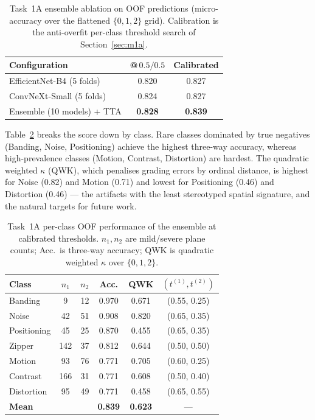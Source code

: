 \documentclass[runningheads]{llncs}
\begin{document}
\begin{table}[htbp]
\caption{Task~1A ensemble ablation on OOF predictions (micro-accuracy over the
flattened $\{0,1,2\}$ grid). Calibration is the anti-overfit per-class threshold
search of Section~\ref{sec:m1a}.}
\label{tab:ensemble}
\centering
\setlength{\tabcolsep}{8pt}
\begin{tabular}{lcc}
\toprule
Configuration & @\,$0.5/0.5$ & Calibrated \\
\midrule
EfficientNet-B4 (5 folds)      & 0.820 & 0.827 \\
ConvNeXt-Small (5 folds)       & 0.824 & 0.827 \\
Ensemble (10 models) + TTA     & \textbf{0.828} & \textbf{0.839} \\
\bottomrule
\end{tabular}
\end{table}

Table~\ref{tab:perclass} breaks the score down by class. Rare classes dominated
by true negatives (Banding, Noise, Positioning) achieve the highest three-way
accuracy, whereas high-prevalence classes (Motion, Contrast, Distortion) are
hardest. The quadratic weighted $\kappa$ (QWK), which penalises grading errors by
ordinal distance, is highest for Noise (0.82) and Motion (0.71) and lowest for
Positioning (0.46) and Distortion (0.46) --- the artifacts with the least
stereotyped spatial signature, and the natural targets for future work.

\begin{table}[htbp]
\caption{Task~1A per-class OOF performance of the ensemble at calibrated
thresholds. $n_1,n_2$ are mild/severe plane counts; Acc.\ is three-way accuracy;
QWK is quadratic weighted $\kappa$ over $\{0,1,2\}$.}
\label{tab:perclass}
\centering
\setlength{\tabcolsep}{6pt}
\begin{tabular}{lccccc}
\toprule
Class & $n_1$ & $n_2$ & Acc. & QWK & $(t^{(1)}, t^{(2)})$ \\
\midrule
Banding     &   9 & 12 & 0.970 & 0.671 & (0.55, 0.25) \\
Noise       &  42 & 51 & 0.908 & 0.820 & (0.65, 0.35) \\
Positioning &  45 & 25 & 0.870 & 0.455 & (0.65, 0.35) \\
Zipper      & 142 & 37 & 0.812 & 0.644 & (0.50, 0.50) \\
Motion      &  93 & 76 & 0.771 & 0.705 & (0.60, 0.25) \\
Contrast    & 166 & 31 & 0.771 & 0.608 & (0.50, 0.40) \\
Distortion  &  95 & 49 & 0.771 & 0.458 & (0.65, 0.55) \\
\midrule
\textbf{Mean} & & & \textbf{0.839} & \textbf{0.623} & --- \\
\bottomrule
\end{tabular}
\end{table}
\end{document}
